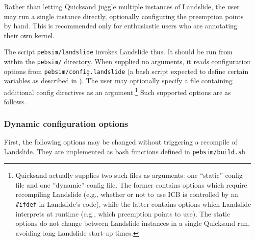 Rather than letting Quicksand juggle multiple instances of Landslide,
the user may run a single instance directly, optionally configuring the preemption points by hand.
This is recommended only for enthusiastic users who are annotating their own kernel.

The script {\tt pebsim/landslide} invokes Landslide thus.
It should be run from within the {\tt pebsim/} directory.
When supplied no arguments, it reads configuration options from {\tt pebsim/config.landslide}
(a bash script expected to define certain variables as described in \sect{\ref{sec:landslide-glue}}).
The user may optionally specify a file containing additional config directives
as an argument.\footnote{
Quicksand actually supplies two such files as arguments: one ``static'' config file and one ''dynamic'' config file.
The former contains options which require recompiling Landslide (e.g., whether or not to use ICB is controlled by an {\tt \#ifdef} in Landslide's code),
while the latter contains options which Landslide interprets at runtime (e.g., which preemption points to use).
The static options do not change between Landslide instances in a single Quicksand run,
avoiding long Landslide start-up times.
}
Such supported options are as follows.

\subsubsection{Dynamic configuration options}
\label{sec:landslide-dynamicconfig}

First, the following options may be changed without triggering a recompile of Landslide.
They are implemented as bash functions defined in {\tt pebsim/build.sh}.


